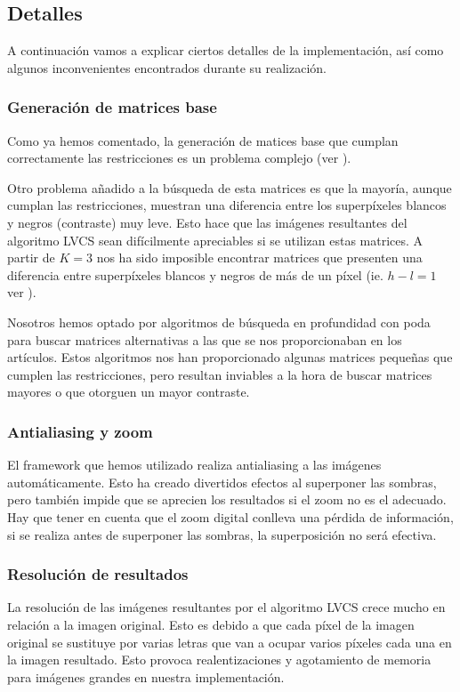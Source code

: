 \subsection{Detalles}
A continuación vamos a explicar ciertos detalles de la implementación, así como
algunos inconvenientes encontrados durante su realización.

\subsubsection{Generación de matrices base}
\label{sec:impl.matrices_base}
Como ya hemos comentado, la generación de matices base que cumplan
correctamente las restricciones es un problema complejo (ver
\cite{generacion_matrices}).

Otro problema añadido a la búsqueda de esta matrices es que la mayoría, aunque
cumplan las restricciones, muestran una diferencia entre los superpíxeles
blancos y negros (contraste) muy leve. Esto hace que las imágenes resultantes
del algoritmo LVCS sean difícilmente apreciables si se utilizan estas matrices.
A partir de $K=3$ nos ha sido imposible encontrar matrices que presenten una
diferencia entre superpíxeles blancos y negros de más de un píxel (ie. $h-l =
1$ ver ).

Nosotros hemos optado por algoritmos de búsqueda en profundidad con poda para
buscar matrices alternativas a las que se nos proporcionaban en los artículos.
Estos algoritmos nos han proporcionado algunas matrices pequeñas que cumplen las
restricciones, pero resultan inviables a la hora de buscar matrices mayores o
que otorguen un mayor contraste.

\subsubsection{Antialiasing y zoom}
El framework que hemos utilizado realiza antialiasing a las imágenes
automáticamente. Esto ha creado divertidos efectos al superponer las sombras,
pero también impide que se aprecien los resultados si el zoom no es el adecuado.
Hay que tener en cuenta que el zoom digital conlleva una pérdida de información,
si se realiza antes de superponer las sombras, la superposición no será
efectiva.

\subsubsection{Resolución de resultados}
La resolución de las imágenes resultantes por el algoritmo LVCS crece mucho en
relación a la imagen original. Esto es debido a que cada píxel de la imagen
original se sustituye por varias letras que van a ocupar varios píxeles cada una
en la imagen resultado. Esto provoca realentizaciones y agotamiento de memoria
para imágenes grandes en nuestra implementación.

